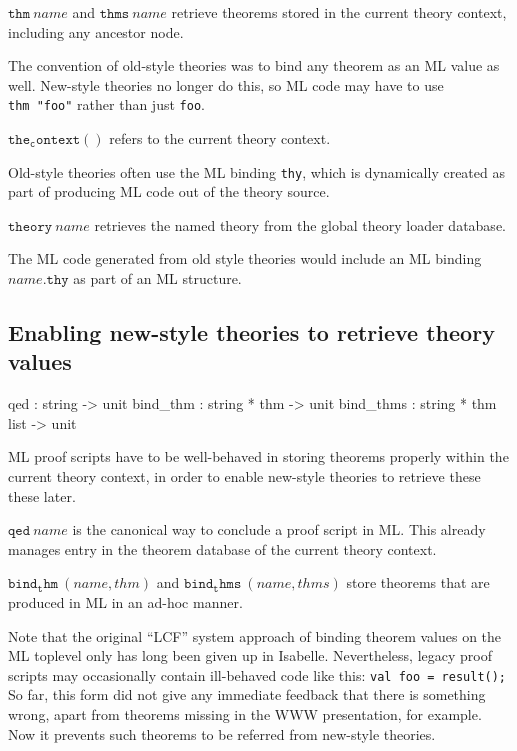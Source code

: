 \begin{descr}
\item [$\mathtt{thm}~name$ and $\mathtt{thms}~name$] retrieve theorems stored
  in the current theory context, including any ancestor node.
  
  The convention of old-style theories was to bind any theorem as an ML value
  as well.  New-style theories no longer do this, so ML code may have to use
  \texttt{thm~"foo"} rather than just \texttt{foo}.
  
\item [$\mathtt{the_context()}$] refers to the current theory context.
  
  Old-style theories often use the ML binding \texttt{thy}, which is
  dynamically created as part of producing ML code out of the theory source.
  
\item [$\mathtt{theory}~name$] retrieves the named theory from the global
  theory loader database.
  
  The ML code generated from old style theories would include an ML binding
  $name\mathtt{.thy}$ as part of an ML structure.
\end{descr}


\subsection{Enabling new-style theories to retrieve theory values}

\begin{ttbox}
qed        : string -> unit
bind_thm   : string * thm -> unit
bind_thms  : string * thm list -> unit
\end{ttbox}

ML proof scripts have to be well-behaved in storing theorems properly within
the current theory context, in order to enable new-style theories to retrieve
these these later.

\begin{descr}
\item [$\mathtt{qed}~name$] is the canonical way to conclude a proof script in
  ML.  This already manages entry in the theorem database of the current
  theory context.
\item [$\mathtt{bind_thm}~(name, thm)$ and $\mathtt{bind_thms}~(name, thms)$]
  store theorems that are produced in ML in an ad-hoc manner.
  
  Note that the original ``LCF'' system approach of binding theorem values on
  the ML toplevel only has long been given up in Isabelle.  Nevertheless,
  legacy proof scripts may occasionally contain ill-behaved code like this:
  \texttt{val foo = result();} So far, this form did not give any immediate
  feedback that there is something wrong, apart from theorems missing in the
  WWW presentation, for example.  Now it prevents such theorems to be referred
  from new-style theories.
\end{descr}


